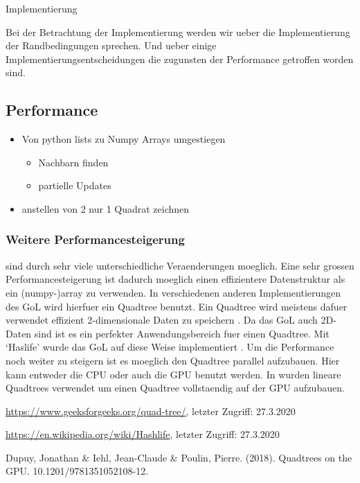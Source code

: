 \documentclass[runningheads]{llncs}
\begin{document}
\begin{section}{Implementierung}
    
    Bei der Betrachtung der Implementierung werden wir ueber die Implementierung der Randbedingungen sprechen.
    Und ueber einige Implementierungsentscheidungen die zugunsten der Performance getroffen worden sind. 
    
    \subsection{Performance}


    \begin{itemize}
        \item Von python lists zu Numpy Arrays umgestiegen
        \begin{itemize}
            \item Nachbarn finden 
            \item partielle Updates 
        \end{itemize}
        \item anstellen von 2 nur 1 Quadrat zeichnen
    \end{itemize}
    
    \subsubsection{Weitere Performancesteigerung}
        sind durch sehr viele unterschiedliche Veraenderungen moeglich.
        Eine sehr grossen Performancesteigerung ist dadurch moeglich einen effizientere Datenstruktur als ein (numpy-)array zu verwenden.
        In verschiedenen anderen Implementierungen des GoL wird hierfuer ein Quadtree benutzt.
        Ein Quadtree wird meistens dafuer verwendet effizient 2-dimensionale Daten zu speichern \cite{quadtreeGeeksForGeeks}.
        Da das GoL auch 2D-Daten sind ist es ein perfekter Anwendungsbereich fuer einen Quadtree.
        Mit `Haslife' wurde das GoL auf diese Weise implementiert \cite{haslifeWiki}. \newline
        Um die Performance noch weiter zu steigern ist es moeglich den Quadtree parallel aufzubauen.
        Hier kann entweder die CPU oder auch die GPU benutzt werden.
        In \cite{quadtreesOnGPU} wurden lineare Quadtrees verwendet um einen Quadtree vollstaendig auf der GPU aufzubauen.

\end{section}


\begin{thebibliography}{8}
    \url{https://www.geeksforgeeks.org/quad-tree/}, letzter Zugriff: 27.3.2020

    \url{https://en.wikipedia.org/wiki/Hashlife}, letzter Zugriff: 27.3.2020

    Dupuy, Jonathan \& Iehl, Jean-Claude \& Poulin, Pierre. (2018).
    Quadtrees on the GPU. 10.1201/9781351052108-12. 

\end{thebibliography}
\end{document}
